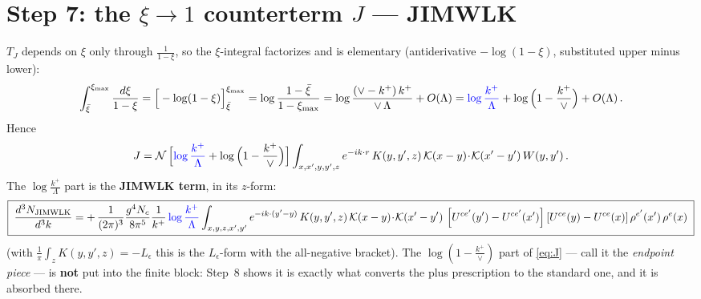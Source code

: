 \documentclass[9pt]{article}
\newcommand{\Leps}{L_{\epsilon}}
\newcommand{\KK}{\mathcal K(x-y)\!\cdot\!\mathcal K(x'-y')}
\newcommand{\Wyy}{\left[U^{ce'}(y') - U^{ce'}(x')\right] \left[U^{ce}(y) - U^{ce}(x)\right] \rho^{e'}(x')\, \rho^{e}(x)}
\begin{document}
\section{Step 7: the $\xi\to1$ counterterm $J$ --- JIMWLK}
$T_{J}$ depends on $\xi$ only through $\frac{1}{1-\xi}$, so the $\xi$-integral factorizes and
is elementary (antiderivative $-\log(1-\xi)$, substituted upper minus lower):
\begin{align}
\int_{\bar\xi}^{\xi_{\max}}\frac{d\xi}{1-\xi}
=\Big[-\log(1-\xi)\Big]_{\bar\xi}^{\xi_{\max}}
=\log\frac{1-\bar\xi}{1-\xi_{\max}}
=\log\frac{(\vee-k^{+})\,k^{+}}{\vee\,\Lambda}+O(\Lambda)
={\color{blue}\log\frac{k^{+}}{\Lambda}}+\log\Big(1-\frac{k^{+}}{\vee}\Big)+O(\Lambda)\,.
\end{align}
Hence
\begin{align}\label{eq:J}
J=\mathcal N\,\Big[{\color{blue}\log\frac{k^{+}}{\Lambda}}+\log\Big(1-\frac{k^{+}}{\vee}\Big)\Big]
\int_{x,x',y,y',z} e^{-ik\cdot r}\,K(y,y',z)\,\KK\,W(y,y')\,.
\end{align}
The $\log\frac{k^{+}}{\Lambda}$ part is the \textbf{JIMWLK term}, in its $z$-form:
\begin{align}\label{eq:jimwlk}
\boxed{\;\frac{d^{3}N_{\rm JIMWLK}}{d^{3}k}
=+\,\frac{1}{(2\pi)^{3}}\frac{g^{4}N_{c}}{8\pi^{5}}\frac{1}{k^{+}}\,{\color{blue}\log\frac{k^{+}}{\Lambda}}
\int_{x,y,z,x',y'}e^{-ik\cdot(y'-y)}\,K(y,y',z)\,\KK\,\Wyy\;}
\end{align}
(with $\frac1\pi\int_{z}K(y,y',z)=-\Leps$ this is the $\Leps$-form with the all-negative
bracket). The $\log(1-\frac{k^{+}}{\vee})$ part of \eqref{eq:J} --- call it the
\emph{endpoint piece} --- is \textbf{not} put into the finite block: Step~8 shows it is
exactly what converts the plus prescription to the standard one, and it is absorbed there.
\end{document}
